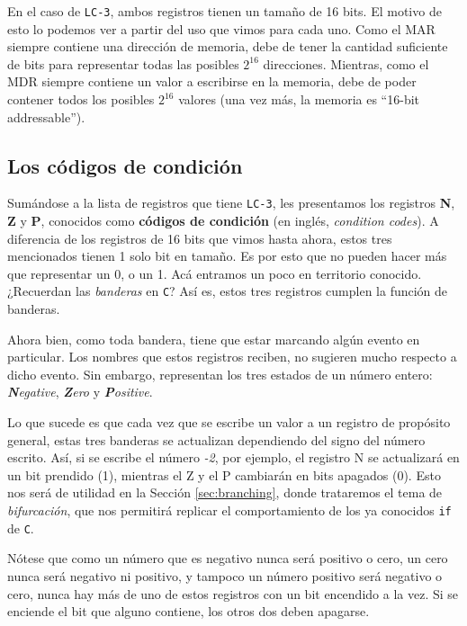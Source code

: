\documentclass[a4paper, titlepage]{report}
\begin{document}
	En el caso de \texttt{LC-3}, ambos registros tienen un tamaño de 16 bits. El motivo de esto lo podemos ver a partir del uso que vimos para cada uno. Como el MAR siempre contiene una dirección de memoria, debe de tener la cantidad suficiente de bits para representar todas las posibles $2^{16}$ direcciones. Mientras, como el MDR siempre contiene un valor a escribirse en la memoria, debe de poder contener todos los posibles $2^{16}$ valores (una vez más, la memoria es ``16-bit addressable'').
	
	
	\subsection{Los códigos de condición} %
	
	Sumándose a la lista de registros que tiene \texttt{LC-3}, les presentamos los registros \textbf{N}, \textbf{Z} y \textbf{P}, conocidos como \textbf{códigos de condición} (en inglés, \textit{condition codes}). A diferencia de los registros de 16 bits que vimos hasta ahora, estos tres mencionados tienen 1 solo bit en tamaño. Es por esto que no pueden hacer más que representar un 0, o un 1. Acá entramos un poco en territorio conocido. ¿Recuerdan las \textit{banderas} en \texttt{C}? Así es, estos tres registros cumplen la función de banderas.
	
	Ahora bien, como toda bandera, tiene que estar marcando algún evento en particular. Los nombres que estos registros reciben, no sugieren mucho respecto a dicho evento. Sin embargo, representan los tres estados de un número entero: \textit{\textbf{N}egative}, \textit{\textbf{Z}ero} y \textit{\textbf{P}ositive}.
	
	Lo que sucede es que cada vez que se escribe un valor a un registro de propósito general, estas tres banderas se actualizan dependiendo del signo del número escrito. Así, si se escribe el número \textit{-2}, por ejemplo, el registro N se actualizará en un bit prendido (1), mientras el Z y el P cambiarán en bits apagados (0). Esto nos será de utilidad en la Sección \ref{sec:branching}, donde trataremos el tema de \textit{bifurcación}, que nos permitirá replicar el comportamiento de los ya conocidos \texttt{if} de \texttt{C}.
	
	Nótese que como un número que es negativo nunca será positivo o cero, un cero nunca será negativo ni positivo, y tampoco un número positivo será negativo o cero, nunca hay más de uno de estos registros con un bit encendido a la vez. Si se enciende el bit que alguno contiene, los otros dos deben apagarse.\\
	
\end{document}
